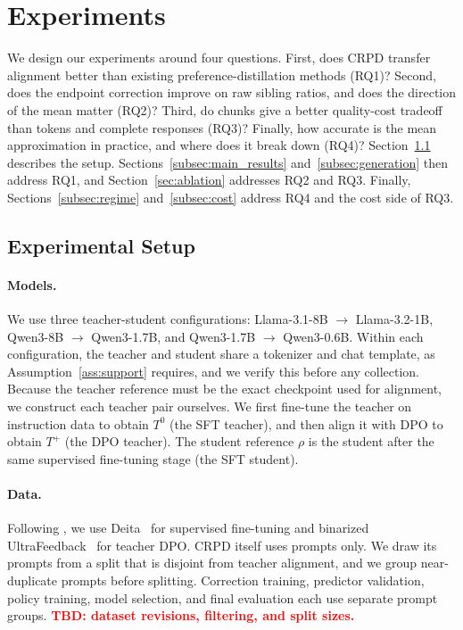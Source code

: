 \documentclass[pdflatex,sn-mathphys-num,review]{sn-jnl}
\theoremstyle{thmstyleone}
\theoremstyle{thmstyletwo}
\theoremstyle{thmstylethree}
\providecommand{\Tp}{T^{+}}
\providecommand{\Tz}{T^{0}}
\newcommand{\tbd}[1][]{\textcolor{red}{\textbf{TBD#1}}}
\begin{document}
\section{Experiments}
\label{sec:llm}

We design our experiments around four questions. First, does CRPD transfer alignment better than existing preference-distillation methods (RQ1)? Second, does the endpoint correction improve on raw sibling ratios, and does the direction of the mean matter (RQ2)? Third, do chunks give a better quality-cost tradeoff than tokens and complete responses (RQ3)? Finally, how accurate is the mean approximation in practice, and where does it break down (RQ4)? Section~\ref{subsec:setup} describes the setup. Sections~\ref{subsec:main_results} and~\ref{subsec:generation} then address RQ1, and Section~\ref{sec:ablation} addresses RQ2 and RQ3. Finally, Sections~\ref{subsec:regime} and~\ref{subsec:cost} address RQ4 and the cost side of RQ3.

\subsection{Experimental Setup}
\label{subsec:setup}

\paragraph{Models.}
We use three teacher-student configurations: Llama-3.1-8B $\to$ Llama-3.2-1B, Qwen3-8B $\to$ Qwen3-1.7B, and Qwen3-1.7B $\to$ Qwen3-0.6B. Within each configuration, the teacher and student share a tokenizer and chat template, as Assumption~\ref{ass:support} requires, and we verify this before any collection. Because the teacher reference must be the exact checkpoint used for alignment, we construct each teacher pair ourselves. We first fine-tune the teacher on instruction data to obtain $\Tz$ (the SFT teacher), and then align it with DPO to obtain $\Tp$ (the DPO teacher). The student reference $\rho$ is the student after the same supervised fine-tuning stage (the SFT student). %

\paragraph{Data.}
Following \citet{van2026narval}, we use Deita~\citep{liu2024what} for supervised fine-tuning and binarized UltraFeedback~\citep{cui2310ultrafeedback} for teacher DPO. CRPD itself uses prompts only. We draw its prompts from a split that is disjoint from teacher alignment, and we group near-duplicate prompts before splitting. Correction training, predictor validation, policy training, model selection, and final evaluation each use separate prompt groups. \tbd[: dataset revisions, filtering, and split sizes.]
\end{document}
